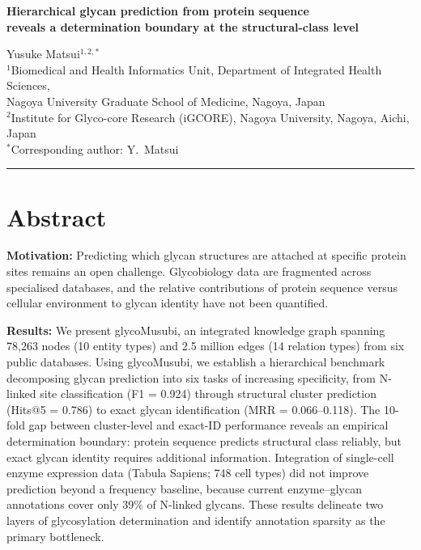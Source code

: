 \documentclass[11pt,a4paper]{article}
\newcommand{\HRule}{\rule{\linewidth}{0.4pt}}
\begin{document}
\begin{center}
{\LARGE\bfseries Hierarchical glycan prediction from protein sequence\\
reveals a determination boundary at the structural-class level}

\vspace{1em}
{\large Yusuke Matsui$^{1,2,*}$}\\[0.3em]
{\normalsize $^1$Biomedical and Health Informatics Unit, Department of Integrated Health Sciences,\\
Nagoya University Graduate School of Medicine, Nagoya, Japan\\
$^2$Institute for Glyco-core Research (iGCORE), Nagoya University, Nagoya, Aichi, Japan}\\[0.3em]
{\normalsize $^*$Corresponding author: Y.\ Matsui}
\end{center}
\HRule
\vspace{0.5em}

\section*{Abstract}

\textbf{Motivation:} Predicting which glycan structures are attached at specific
protein sites remains an open challenge. Glycobiology data are fragmented
across specialised databases, and the relative contributions of protein
sequence versus cellular environment to glycan identity have not been
quantified.

\textbf{Results:} We present glycoMusubi, an integrated knowledge graph spanning
78,263 nodes (10 entity types) and 2.5 million edges (14 relation types) from
six public databases. Using glycoMusubi, we establish a hierarchical benchmark
decomposing glycan prediction into six tasks of increasing specificity, from
N-linked site classification (F1 = 0.924) through structural cluster prediction
(Hits@5 = 0.786) to exact glycan identification (MRR = 0.066--0.118). The
10-fold gap between cluster-level and exact-ID performance reveals an
empirical determination boundary: protein sequence predicts structural class
reliably, but exact glycan identity requires additional information. Integration
of single-cell enzyme expression data (Tabula Sapiens; 748 cell types) did not
improve prediction beyond a frequency baseline, because current enzyme--glycan
annotations cover only 39\% of N-linked glycans. These results delineate two
layers of glycosylation determination and identify annotation sparsity as the
primary bottleneck.
\end{document}
